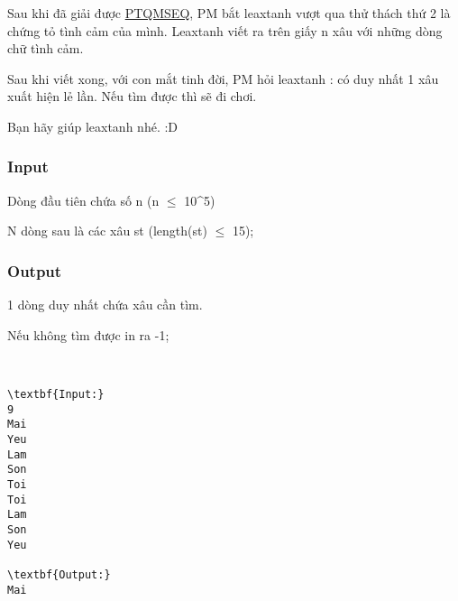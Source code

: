 

Sau khi đã giải được \href{http://vnoi.info/problems/show/PTQMSEQ/}{PTQMSEQ}, PM bắt leaxtanh vượt qua thử thách thứ 2 là chứng tỏ tình cảm của mình. Leaxtanh viết ra trên giấy n xâu với những dòng chữ tình cảm.

Sau khi viết xong, với con mắt tinh đời, PM hỏi leaxtanh : có duy nhất 1 xâu xuất hiện lẻ lần. Nếu tìm được thì sẽ đi chơi.

Bạn hãy giúp leaxtanh nhé. :D

\subsubsection{Input}

Dòng đầu tiên chứa số n (n  $\le$  10^5)

N dòng sau là các xâu st (length(st)  $\le$ 15);

\subsubsection{Output}

1 dòng duy nhất chứa xâu cần tìm.

Nếu không tìm được in ra -1;

 
\begin{verbatim}
\textbf{Input:}
9
Mai
Yeu
Lam
Son
Toi
Toi 
Lam
Son
Yeu

\textbf{Output:}
Mai\end{verbatim}
